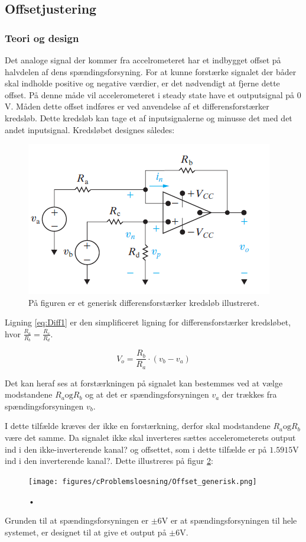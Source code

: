 \subsection{Offsetjustering}
\subsubsection{Teori og design}
Det analoge signal der kommer fra accelrometeret har et indbygget offset på halvdelen af dens spændingsforsyning. For at kunne forstærke signalet der båder skal indholde positive og negative værdier, er det nødvendigt at fjerne dette offset. På denne måde vil accelerometeret i steady state have et outputsignal på $0$V. Måden dette offset indføres er ved anvendelse af et differensforstærker kredsløb. Dette kredsløb kan tage et af inputsignalerne og minusse det med det andet inputsignal. Kredsløbet designes således:

\begin{figure}[H]
\centering
\includegraphics[scale=1]{figures/cProblemloesning/Differensforstaerker_generisk.png}
\caption{På figuren er et generisk differensforstærker kredsløb illustreret.}
\label{fig:Differensforstaerker_generisk}
\end{figure}

Ligning \ref{eq:Diff1} er den simplificeret ligning for differensforstærker kredsløbet, hvor $\frac{R_a}{R_b} = \frac{R_c}{R_d}$.

\begin{equation}\label{eq:Diff1}
V_o = \frac{R_b}{R_a} \cdot (v_b - v_a)
\end{equation}

Det kan heraf ses at forstærkningen på signalet kan bestemmes ved at vælge modstandene $R_a \text{og} R_b$ og at det er spændingsforsyningen $v_a$ der trækkes fra spændingsforsyningen $v_b$. 

I dette tilfælde kræves der ikke en forstærkning, derfor skal modstandene $R_a \text{og} R_b$ være det samme. Da signalet ikke skal inverteres sættes accelerometerets output ind i den ikke-inverterende kanal? og offsettet, som i dette tilfælde er på $1.5915$V ind i den inverterende kanal?. Dette illustreres på figur \ref{fig:Offset_generisk}:
\begin{figure}[H]
\centering
\texttt{[image: figures/cProblemsloesning/Offset\_generisk.png]}
\caption{•}
\label{fig:Offset_generisk}
\end{figure}

Grunden til at spændingsforsyningen er $\pm 6$V er at spændingsforsyningen til hele systemet, er designet til at give et output på $\pm 6$V. 